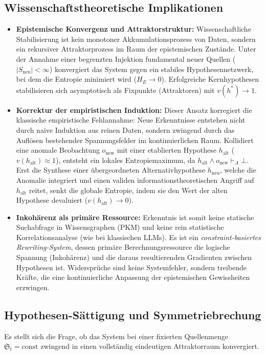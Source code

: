 \documentclass[11pt, a4paper]{article}
\begin{document}
	\subsection{Wissenschaftstheoretische Implikationen}
	\begin{itemize}
		\item \textbf{Epistemische Konvergenz und Attraktorstruktur:}
		Wissenschaftliche Stabilisierung ist kein monotoner Akkumulationsprozess von Daten, sondern ein rekursiver Attraktorprozess im Raum der epistemischen Zustände. Unter der Annahme einer begrenzten Injektion fundamental neuer Quellen ($|S_{\text{neu}}| < \infty$) konvergiert das System gegen ein stabiles Hypothesennetzwerk, bei dem die Entropie minimiert wird ($H_E \to 0$). Erfolgreiche Kernhypothesen stabilisieren sich asymptotisch als Fixpunkte (Attraktoren) mit $v(h^*) \to 1$.
		
		\item \textbf{Korrektur der empiristischen Induktion:}
		Dieser Ansatz korregiert die klassische empiristische Fehlannahme: Neue Erkenntnisse entstehen nicht durch naive Induktion aus reinen Daten, sondern zwingend durch das Auflösen bestehender Spannungsfelder im kontinuierlichen Raum. Kollidiert eine anomale Beobachtung $o_{\text{new}}$ mit einer etablierten Hypothese $h_{\text{alt}}$ ($v(h_{\text{alt}}) \approx 1$), entsteht ein lokales Entropiemaximum, da $h_{\text{alt}} \land o_{\text{new}} \vdash_A \bot$. Erst die Synthese einer übergeordneten Alternativhypothese $h_{\text{neu}}$, welche die Anomalie integriert und einen validen informationstheoretischen Angriff auf $h_{\text{alt}}$ reitet, senkt die globale Entropie, indem sie den Wert der alten Hypothese devaluiert ($v(h_{\text{alt}}) \to 0$).
		
		\item \textbf{Inkohärenz als primäre Ressource:}
		Erkenntnis ist somit keine statische Suchabfrage in Wissensgraphen (PKM) und keine rein statistische Korrelationsanalyse (wie bei klassischen LLMs). Es ist ein \emph{constraint-basiertes Rewriting-System}, dessen primäre Berechnungsressource die logische Spannung (Inkohärenz) und die daraus resultierenden Gradienten zwischen Hypothesen ist. Widersprüche sind keine Systemfehler, sondern treibende Kräfte, die eine kontinuierliche Anpassung der epistemischen Gewissheiten erzwingen.
	\end{itemize}
	
	\subsection{Hypothesen-Sättigung und Symmetriebrechung}
	Es stellt sich die Frage, ob das System bei einer fixierten Quellenmenge $\mathfrak{S}_t = \text{const} $ zwingend in einen vollständig eindeutigen Attraktorraum konvergiert.
	
\end{document}
